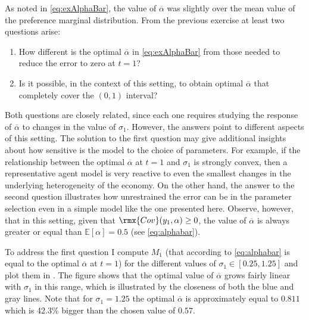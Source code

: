 \documentclass[english, a4paper, 12pt]{article}
\begin{document}
\newpage
As noted in \eqref{eq:exAlphaBar}, the value of $\overline{\alpha}$ was slightly over the mean value of the preference marginal distribution. From the previous exercise at least two questions arise:
	\begin{enumerate}
		\item How different is the optimal $\overline{\alpha}$ in \eqref{eq:exAlphaBar} from those needed to reduce the error to zero at $t = 1$?
		\item Is it possible, in the context of this setting, to obtain optimal $\overline{\alpha}$ that completely cover the $(0,1)$ interval?  
	\end{enumerate}
Both questions are closely related, since each one requires studying the response of $\overline{\alpha}$ to changes in the value of $\sigma_{1}$. However, the answers point to different aspects of this setting. The solution to the first question may give additional insights about how sensitive is the model to the choice of parameters. For example, if the relationship between the optimal $\overline{\alpha}$ at $t = 1$ and $\sigma_{1}$ is strongly convex, then a representative agent model is very reactive to even the smallest changes in the underlying heterogeneity of the economy. On the other hand, the answer to the second question illustrates how unrestrained the error can be in the parameter selection even in a simple model like the one presented here. Observe, however, that in this setting, given that $\rmx{Cov}(y_{1},\alpha) \geq 0$, the value of $\overline{\alpha}$ is always greater or equal than $\mathbb{E}[\alpha] = 0.5$ (see \eqref{eq:alphabar}).

To address the first question I compute $M_{1}$ (that according to \eqref{eq:alphabar} is equal to the optimal $\overline{\alpha}$ at $t = 1$) for the different values of $\sigma_{1} \in [0.25, 1.25]$ and plot them in . The figure shows that the optimal value of $\overline{\alpha}$ grows fairly linear with $\sigma_{1}$ in this range, which is illustrated by the closeness of both the blue and gray lines. Note that for $\sigma_{1} = 1.25$ the optimal $\overline{\alpha}$ is approximately equal to $0.811$ which is 42.3\% bigger than the chosen value of $0.57$.
\end{document}
